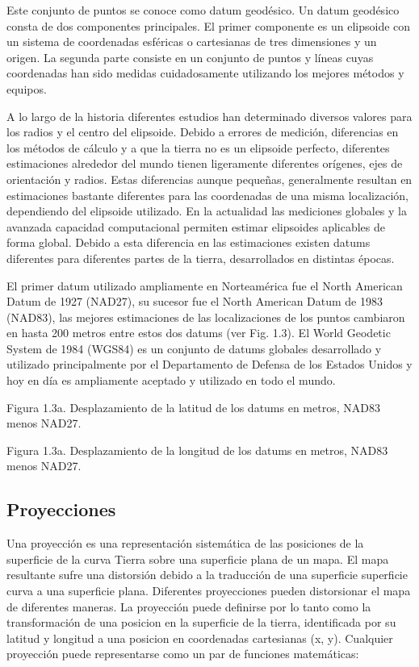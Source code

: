 Este conjunto de puntos se conoce como datum geodésico.  Un datum geodésico consta de dos componentes principales. El primer componente es un elipsoide con un sistema de coordenadas esféricas o cartesianas de tres dimensiones y un origen. La segunda parte consiste en un conjunto de puntos y líneas cuyas coordenadas han sido medidas cuidadosamente utilizando los mejores métodos y equipos.

A lo largo de la historia diferentes estudios han determinado diversos valores para los radios y el centro del elipsoide. Debido a errores de medición, diferencias en los métodos de cálculo y a que la tierra no es un elipsoide perfecto, diferentes estimaciones alrededor del mundo tienen ligeramente diferentes orígenes, ejes de orientación y radios. Estas diferencias aunque pequeñas, generalmente resultan en estimaciones bastante diferentes para las coordenadas de una misma localización,  dependiendo del elipsoide utilizado. En la actualidad las mediciones globales y la avanzada capacidad computacional permiten estimar elipsoides aplicables de forma global. Debido a esta diferencia en las estimaciones existen datums diferentes para diferentes partes de la tierra, desarrollados en distintas épocas.

El primer datum utilizado ampliamente en Norteamérica fue el North American Datum de 1927 (NAD27), su sucesor fue el North American Datum de 1983 (NAD83), las mejores estimaciones de las localizaciones de los puntos cambiaron en hasta 200 metros entre estos dos datums (ver Fig. 1.3). El World Geodetic System de 1984 (WGS84) es un conjunto de datums globales desarrollado y utilizado principalmente por el Departamento de Defensa de los Estados Unidos y hoy en día es ampliamente aceptado y utilizado en todo el mundo.

Figura 1.3a. Desplazamiento de la latitud de los datums en metros, NAD83 menos NAD27.

Figura 1.3a. Desplazamiento de la longitud de los datums en metros, NAD83 menos NAD27.

\subsection{Proyecciones}

Una proyección es una representación sistemática de las posiciones de la superficie de la curva Tierra sobre una superficie plana de un mapa. El mapa resultante sufre una distorsión debido a la traducción de una superficie superficie curva a una superficie plana. Diferentes proyecciones pueden distorsionar el mapa de diferentes maneras. La proyección puede definirse por lo tanto como la transformación de una posicion en la superficie de la tierra, identificada por su latitud y longitud
a una posicion en coordenadas cartesianas (x, y). Cualquier proyección puede representarse como un par de funciones matemáticas:

